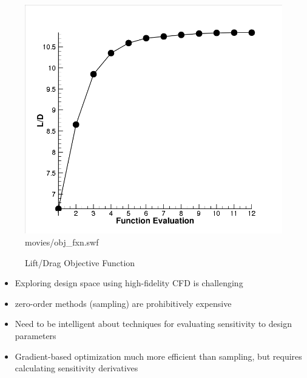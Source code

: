 \documentclass{beamer}
\begin{document}
\begin{frame}
\begin{figure}[ht]
\begin{minipage}[b]{0.45\linewidth}
\begin{cboxt}[white]
           {\includegraphics{movies/obj_fxn.png}}{movies/obj_fxn.swf}
         \end{cboxt}
         \caption{Lift/Drag Objective Function}
     \end{minipage}
  \end{figure}
  \vspace{-.5cm}
  \begin{itemize}
    \item Exploring design space using high-fidelity CFD is challenging
    \item zero-order methods (sampling) are prohibitively expensive
    \item Need to be intelligent about techniques for evaluating sensitivity to
      design parameters
    \item Gradient-based optimization much more efficient than sampling, but
      requires calculating sensitivity derivatives
  \end{itemize}
\end{frame}
\end{document}
